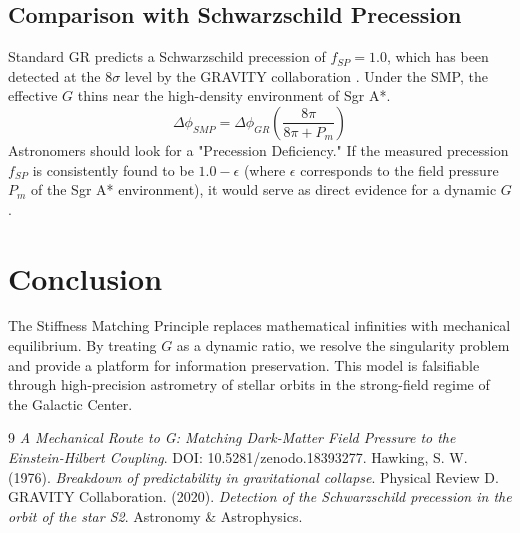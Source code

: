 \documentclass[11pt,letterpaper]{article}
\begin{document}
\subsection{Comparison with Schwarzschild Precession}
Standard GR predicts a Schwarzschild precession of $f_{SP} = 1.0$, which has been detected at the $8\sigma$ level by the GRAVITY collaboration \cite{GRAVITY2020}. Under the SMP, the effective $G$ thins near the high-density environment of Sgr A*.
\begin{equation}
\Delta \phi_{SMP} = \Delta \phi_{GR} \left( \frac{8\pi}{8\pi + P_m} \right)
\end{equation}
Astronomers should look for a "Precession Deficiency." If the measured precession $f_{SP}$ is consistently found to be $1.0 - \epsilon$ (where $\epsilon$ corresponds to the field pressure $P_m$ of the Sgr A* environment), it would serve as direct evidence for a dynamic $G$.



\section{Conclusion}
The Stiffness Matching Principle replaces mathematical infinities with mechanical equilibrium. By treating $G$ as a dynamic ratio, we resolve the singularity problem and provide a platform for information preservation. This model is falsifiable through high-precision astrometry of stellar orbits in the strong-field regime of the Galactic Center.

\begin{thebibliography}{9}
\textit{A Mechanical Route to G: Matching Dark-Matter Field Pressure to the Einstein-Hilbert Coupling}. DOI: 10.5281/zenodo.18393277.
Hawking, S. W. (1976). \textit{Breakdown of predictability in gravitational collapse}. Physical Review D.
GRAVITY Collaboration. (2020). \textit{Detection of the Schwarzschild precession in the orbit of the star S2}. Astronomy \& Astrophysics.
\end{thebibliography}
\end{document}
